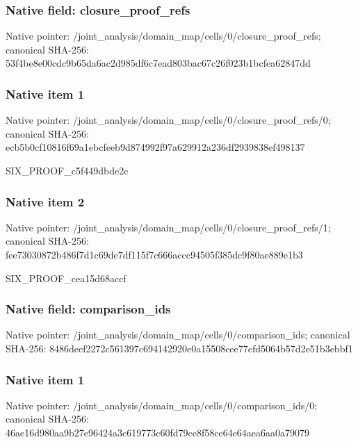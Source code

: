 \documentclass[10pt,a4paper]{article}
\begin{document}
\subsubsection{Native field: closure\_proof\_refs}


Native pointer: /joint\_analysis/domain\_m\allowbreak{}ap/cells/0/closure\_proof\allowbreak{}\_refs; canonical SHA-256: 53f4be8e00cdc9b65da6ac2d\allowbreak{}985df6c7ead803bac67c26f0\allowbreak{}23b1bcfea62847dd



\subsubsection{Native item 1}


Native pointer: /joint\_analysis/domain\_m\allowbreak{}ap/cells/0/closure\_proof\allowbreak{}\_refs/0; canonical SHA-256: ecb5b0cf10816f69a1ebcfee\allowbreak{}b9d874992f97a629912a236d\allowbreak{}f2939838ef498137


SIX\_PROOF\_c5f449dbde2c


\subsubsection{Native item 2}


Native pointer: /joint\_analysis/domain\_m\allowbreak{}ap/cells/0/closure\_proof\allowbreak{}\_refs/1; canonical SHA-256: fee73030872b486f7d1c69de\allowbreak{}7df115f7c666accc94505f38\allowbreak{}5dc9f80ae889e1b3


SIX\_PROOF\_cea15d68accf


\subsubsection{Native field: comparison\_ids}


Native pointer: /joint\_analysis/domain\_m\allowbreak{}ap/cells/0/comparison\_id\allowbreak{}s; canonical SHA-256: 8486deef2272c561397c6941\allowbreak{}42920e0a15508cee77cfd506\allowbreak{}4b57d2e51b3ebbf1



\subsubsection{Native item 1}


Native pointer: /joint\_analysis/domain\_m\allowbreak{}ap/cells/0/comparison\_id\allowbreak{}s/0; canonical SHA-256: 46ae16d980aa9b27e96424a3\allowbreak{}c619773c60fd79ce8f58ce64\allowbreak{}e64aea6aa0a79079
\end{document}
